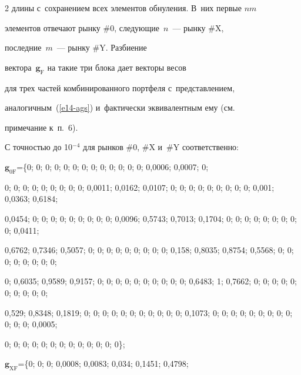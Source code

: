 \begin{multicols}{2}
длины с~сохранением всех элементов обнуления. В~них первые $nm$ 


элементов отвечают рынку \#0, следующие~$n$~--- рынку \#X, 


последние~$m$~--- рынку \#Y. Разбиение 


вектора~$\boldsymbol{g}_{\mathrm{F}}$ на такие три блока дает векторы весов 


для трех час\-тей комбинированного портфеля с~представлением,  


аналогичным~(\ref{e14-ags}) и~фактически эквивалентным ему (см.\ 


примечание к~п.~6). 


  


  


  С точностью до 10$^{-4}$ для рынков \#0, \#X и~\#Y соответственно: 


  


  \vspace*{3pt}


  


 \noindent


  $\boldsymbol{g}_{\mathrm{0F}}$\;=\;\{0; 0; 0; 0; 0; 0; 0; 0; 0; 0; 0; 0; 0; 0,0006; 0,0007; 0; 


0; 0; 0; 0; 0; 0; 0; 0; 0; 0,0011; 0,0162; 0,0107; 0; 0; 0; 0; 0; 0; 0; 0; 0; 0,001; 0,0363; 0,6184; 


0,0454; 0; 0; 0; 0; 0; 0; 0; 0; 0; 0,0096; 0,5743; 0,7013; 0,1704; 0; 0; 0; 0; 0; 0; 0; 0; 0; 0,0411; 


0,6762; 0,7346; 0,5057; 0; 0; 0; 0; 0; 0; 0; 0; 0; 0,158; 0,8035; 0,8754; 0,5568; 0; 0; 0; 0; 0; 0; 0; 0; 


0; 0,6035; 0,9589; 0,9157; 0; 0; 0; 0; 0; 0; 0; 0; 0; 0; 0,6483; 1; 0,7662; 0; 0; 0; 0; 0; 0; 0; 0; 0; 0; 


0,529; 0,8348; 0,1819; 0; 0; 0; 0; 0; 0; 0; 0; 0; 0; 0; 0,1073; 0; 0; 0; 0; 0; 0; 0; 0; 0; 0; 0; 0; 0,0005; 


0; 0; 0; 0; 0; 0; 0; 0; 0; 0; 0; 0; 0\}; 





  \vspace*{3pt}


  


\noindent


  $\boldsymbol{g}_{\mathrm{XF}}$\;=\;\{0; 0; 0; 0,0008; 0,0083; 0,034; 0,1451; 0,4798; 



\end{multicols}
